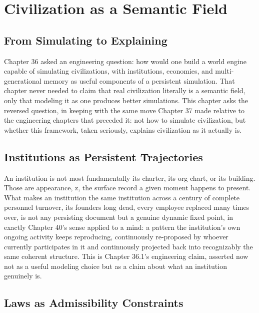 \chapter{Civilization as a Semantic Field}

\section{From Simulating to Explaining}

Chapter 36 asked an engineering question: how would one build a world engine capable of simulating civilizations, with institutions, economies, and multi-generational memory as useful components of a persistent simulation. That chapter never needed to claim that real civilization literally is a semantic field, only that modeling it as one produces better simulations. This chapter asks the reversed question, in keeping with the same move Chapter 37 made relative to the engineering chapters that preceded it: not how to simulate civilization, but whether this framework, taken seriously, explains civilization as it actually is.

\section{Institutions as Persistent Trajectories}

An institution is not most fundamentally its charter, its org chart, or its building. Those are appearance, z, the surface record a given moment happens to present. What makes an institution the same institution across a century of complete personnel turnover, its founders long dead, every employee replaced many times over, is not any persisting document but a genuine dynamic fixed point, in exactly Chapter 40's sense applied to a mind: a pattern the institution's own ongoing activity keeps reproducing, continuously re-proposed by whoever currently participates in it and continuously projected back into recognizably the same coherent structure. This is Chapter 36.1's engineering claim, asserted now not as a useful modeling choice but as a claim about what an institution genuinely is.

\section{Laws as Admissibility Constraints}

